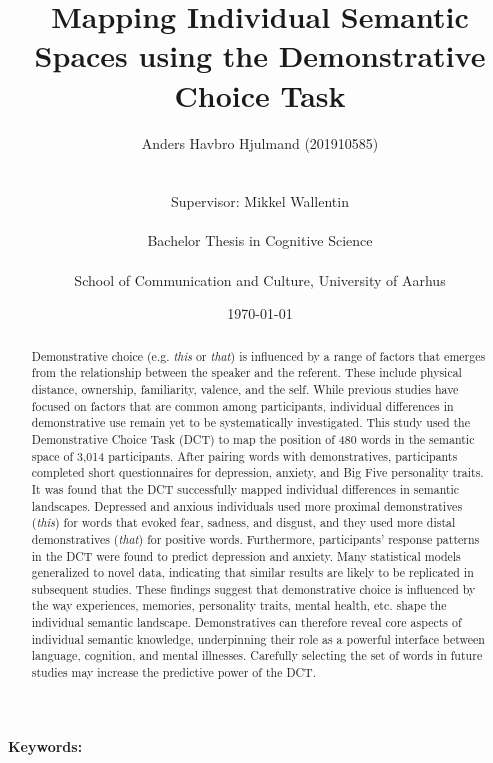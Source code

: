 \documentclass[11pt, a4paper]{article}
\title{Mapping Individual Semantic Spaces using the Demonstrative Choice Task} \\ \\
\author{Anders Havbro Hjulmand (201910585)\\ \\ \\
Supervisor: Mikkel Wallentin\\ \\ 
Bachelor Thesis in Cognitive Science\\ \\
School of Communication and Culture, University of Aarhus}
\date{\today}
\begin{document}
\maketitle

\begin{abstract}
Demonstrative choice (e.g. \textit{this} or \textit{that}) is influenced by a range of factors that emerges from the relationship between the speaker and the referent. These include physical distance, ownership, familiarity, valence, and the self. While previous studies have focused on factors that are common among participants, individual differences in demonstrative use remain yet to be systematically investigated. This study used the Demonstrative Choice Task (DCT) to map the position of 480 words in the semantic space of 3,014 participants. After pairing words with demonstratives, participants completed short questionnaires for depression, anxiety, and Big Five personality traits. It was found that the DCT successfully mapped individual differences in semantic landscapes. Depressed and anxious individuals used more proximal demonstratives (\textit{this}) for words that evoked fear, sadness, and disgust, and they used more distal demonstratives (\textit{that}) for positive words. Furthermore, participants’ response patterns in the DCT were found to predict depression and anxiety. Many statistical models generalized to novel data, indicating that similar results are likely to be replicated in subsequent studies. These findings suggest that demonstrative choice is influenced by the way experiences, memories, personality traits, mental health, etc. shape the individual semantic landscape. Demonstratives can therefore reveal core aspects of individual semantic knowledge, underpinning their role as a powerful interface between language, cognition, and mental illnesses. Carefully selecting the set of words in future studies may increase the predictive power of the DCT. 
\end{abstract}

\textbf{Keywords:} 
\\ \\

\\


\newpage

\tableofcontents
\end{document}
